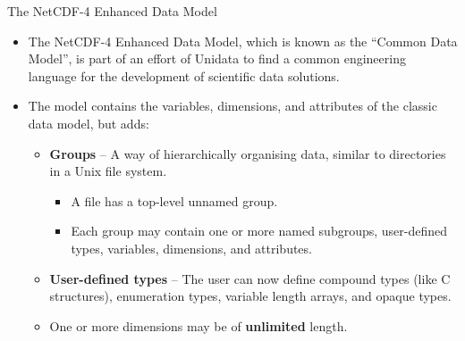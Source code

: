 \documentclass[compress,11pt,xcolor=svgnames,aspectratio=169]{beamer}
\begin{document}
\begin{frame}[fragile]{The NetCDF-4 Enhanced Data Model}

\begin{itemize}
\setlength\itemsep{0.2cm}

    \item The NetCDF-4 Enhanced Data Model, which is known as the ``Common Data Model'', is part of an effort of Unidata to find a common engineering language for the development of scientific data solutions.

    \item The model contains the variables, dimensions, and attributes of the classic data model, but adds:\\[0.2cm]

    \begin{itemize}
    \setlength\itemsep{0.2cm}

        \item \textbf{Groups} -- A way of hierarchically organising data, similar to directories in a Unix file system.\\[0.2cm]

        \begin{itemize}
        \setlength\itemsep{0.1cm}
            \item A file has a top-level unnamed group.
            \item Each group may contain one or more named subgroups, user-defined types, variables, dimensions, and attributes.
        \end{itemize}

        \item \textbf{User-defined types} -- The user can now define compound types (like C structures), enumeration types, variable length arrays, and opaque types.

        \item One or more dimensions may be of \textbf{unlimited} length.

    \end{itemize}

\end{itemize}

\nocite{netcdf}

\end{frame}
\end{document}
